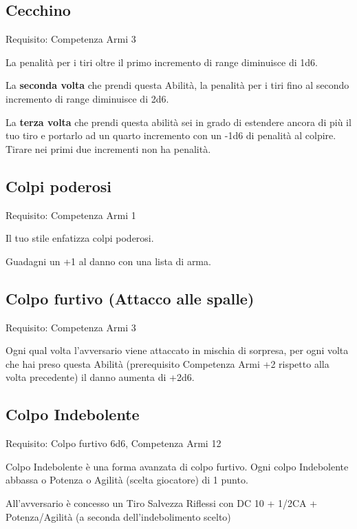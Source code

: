 \documentclass[a4paper,11pt,twoside,openany]{book}
\begin{document}
\subsection{Cecchino}

Requisito: Competenza Armi 3

La penalità per i tiri oltre il primo incremento di range diminuisce di 1d6.

La \textbf{seconda volta} che prendi questa Abilità, la penalità per i tiri fino al secondo incremento di range diminuisce di 2d6.

La \textbf{terza volta} che prendi questa abilità sei in grado di estendere ancora di più il tuo tiro e portarlo ad un quarto incremento con un -1d6 di penalità al colpire. Tirare nei primi due incrementi non ha penalità.

\subsection{Colpi poderosi}

Requisito: Competenza Armi 1

Il tuo stile enfatizza colpi poderosi.

Guadagni un +1 al danno con una lista di arma.

\subsection{Colpo furtivo (Attacco alle spalle)}

Requisito: Competenza Armi 3

Ogni qual volta l'avversario viene attaccato in mischia di sorpresa, per ogni volta che hai preso questa Abilità (prerequisito Competenza Armi +2 rispetto alla volta precedente) il danno aumenta di +2d6.

\subsection{Colpo Indebolente}

Requisito: Colpo furtivo 6d6, Competenza Armi 12

Colpo Indebolente è una forma avanzata di colpo furtivo. Ogni colpo Indebolente abbassa o Potenza o Agilità (scelta giocatore) di 1 punto.

All'avversario è concesso un Tiro Salvezza Riflessi con DC 10 + 1/2CA + Potenza/Agilità (a seconda dell'indebolimento scelto)
\end{document}

